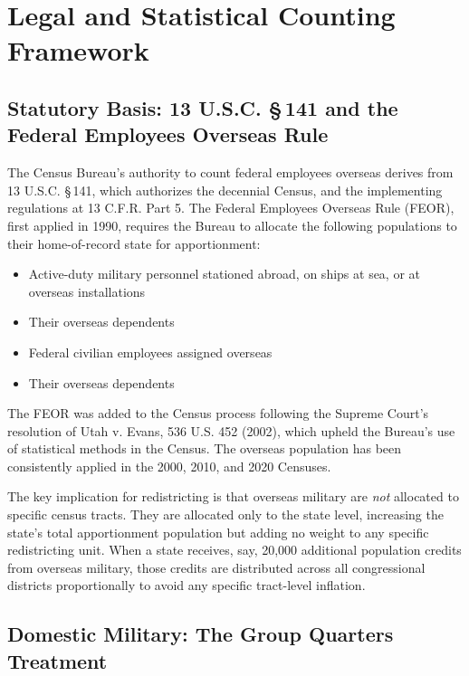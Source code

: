\section{Legal and Statistical Counting Framework}
\label{sec:framework}

\subsection{Statutory Basis: 13 U.S.C. \S\,141 and the Federal Employees Overseas Rule}

The Census Bureau's authority to count federal employees overseas derives from 13 U.S.C. \S\,141, which authorizes the decennial Census, and the implementing regulations at 13 C.F.R. Part 5. The Federal Employees Overseas Rule (FEOR), first applied in 1990, requires the Bureau to allocate the following populations to their home-of-record state for apportionment:

\begin{itemize}
    \item Active-duty military personnel stationed abroad, on ships at sea, or at overseas installations
    \item Their overseas dependents
    \item Federal civilian employees assigned overseas
    \item Their overseas dependents
\end{itemize}

The FEOR was added to the Census process following the Supreme Court's resolution of Utah v. Evans, 536 U.S. 452 (2002), which upheld the Bureau's use of statistical methods in the Census. The overseas population has been consistently applied in the 2000, 2010, and 2020 Censuses.

The key implication for redistricting is that overseas military are \emph{not} allocated to specific census tracts. They are allocated only to the state level, increasing the state's total apportionment population but adding no weight to any specific redistricting unit. When a state receives, say, 20,000 additional population credits from overseas military, those credits are distributed across all congressional districts proportionally to avoid any specific tract-level inflation.

\subsection{Domestic Military: The Group Quarters Treatment}

